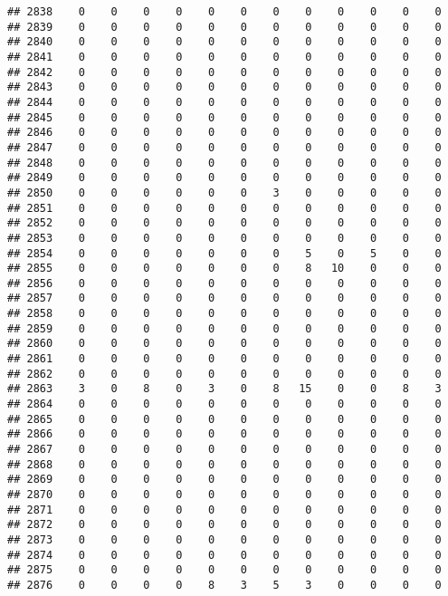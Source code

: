 \documentclass[]{article}
\begin{document}
\begin{verbatim}
## 2838    0    0    0    0    0    0    0    0    0    0    0    0
## 2839    0    0    0    0    0    0    0    0    0    0    0    0
## 2840    0    0    0    0    0    0    0    0    0    0    0    0
## 2841    0    0    0    0    0    0    0    0    0    0    0    0
## 2842    0    0    0    0    0    0    0    0    0    0    0    0
## 2843    0    0    0    0    0    0    0    0    0    0    0    0
## 2844    0    0    0    0    0    0    0    0    0    0    0    0
## 2845    0    0    0    0    0    0    0    0    0    0    0    0
## 2846    0    0    0    0    0    0    0    0    0    0    0    0
## 2847    0    0    0    0    0    0    0    0    0    0    0    0
## 2848    0    0    0    0    0    0    0    0    0    0    0    0
## 2849    0    0    0    0    0    0    0    0    0    0    0    0
## 2850    0    0    0    0    0    0    3    0    0    0    0    0
## 2851    0    0    0    0    0    0    0    0    0    0    0    0
## 2852    0    0    0    0    0    0    0    0    0    0    0    0
## 2853    0    0    0    0    0    0    0    0    0    0    0    0
## 2854    0    0    0    0    0    0    0    5    0    5    0    0
## 2855    0    0    0    0    0    0    0    8   10    0    0    0
## 2856    0    0    0    0    0    0    0    0    0    0    0    0
## 2857    0    0    0    0    0    0    0    0    0    0    0    0
## 2858    0    0    0    0    0    0    0    0    0    0    0    0
## 2859    0    0    0    0    0    0    0    0    0    0    0    0
## 2860    0    0    0    0    0    0    0    0    0    0    0    0
## 2861    0    0    0    0    0    0    0    0    0    0    0    0
## 2862    0    0    0    0    0    0    0    0    0    0    0    0
## 2863    3    0    8    0    3    0    8   15    0    0    8    3
## 2864    0    0    0    0    0    0    0    0    0    0    0    0
## 2865    0    0    0    0    0    0    0    0    0    0    0    0
## 2866    0    0    0    0    0    0    0    0    0    0    0    0
## 2867    0    0    0    0    0    0    0    0    0    0    0    0
## 2868    0    0    0    0    0    0    0    0    0    0    0    0
## 2869    0    0    0    0    0    0    0    0    0    0    0    0
## 2870    0    0    0    0    0    0    0    0    0    0    0    0
## 2871    0    0    0    0    0    0    0    0    0    0    0    0
## 2872    0    0    0    0    0    0    0    0    0    0    0    0
## 2873    0    0    0    0    0    0    0    0    0    0    0    0
## 2874    0    0    0    0    0    0    0    0    0    0    0    0
## 2875    0    0    0    0    0    0    0    0    0    0    0    0
## 2876    0    0    0    0    8    3    5    3    0    0    0    0

\end{verbatim}
\end{document}
